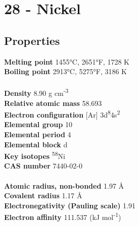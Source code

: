 \section{28 - Nickel}
\label{sec:elem-nickel}
\subsection{Properties}
\textbf{Melting point} 1455°C, 2651°F, 1728 K\\
\textbf{Boiling point} 2913°C, 5275°F, 3186 K\\
\\
\textbf{Density} 8.90 g cm\textsuperscript{-3}\\
\textbf{Relative atomic mass} 58.693\\
\textbf{Electron configuration} [Ar] 3d\textsuperscript{8}4s\textsuperscript{2}\\
\textbf{Elemental group} 10\\
\textbf{Elemental period} 4\\
\textbf{Elemental block} d\\
\textbf{Key isotopes} \textsuperscript{58}Ni\\
\textbf{CAS number} 7440-02-0\\
\\
\textbf{Atomic radius, non-bonded} 1.97 Å\\
\textbf{Covalent radius} 1.17 Å\\
\textbf{Electronegativity (Pauling scale)} 1.91\\
\textbf{Electron affinity} 111.537 (kJ mol\textsuperscript{-1})\\